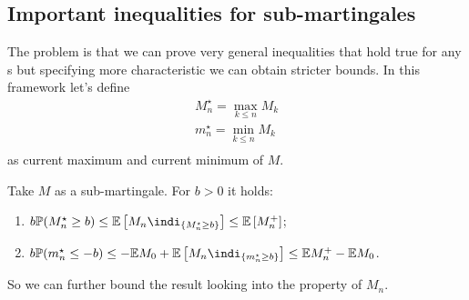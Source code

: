 \documentclass{report}
\begin{document}
\subsection{Important inequalities for sub-martingales}
The problem is that we can prove very general inequalities that hold true for any \rv s but specifying more characteristic we can obtain stricter bounds. In this framework let's define 
\begin{equation*}
	\begin{array}{l}
		M^{\star}_{n}=\max_{k\leq n}M_{k}\\
		m^{\star}_{n}=\min_{k\leq n}M_{k}\\
	\end{array}
\end{equation*}
as current maximum and current minimum of $M$.
\begin{theorem}
	Take $M$ as a sub-martingale. For $b>0$ it holds:
	\begin{enumerate}
		\item $b\pr(M^{\star}_{n}\geq b)\leq\ev\left[M_{n}\indi_{\{M_{n}^{\star}\geq b\}}\right]\leq\ev\left[M_{n}^{+}\right]$;
		\item $b\pr(m^{\star}_{n}\leq-b)\leq-\ev M_{0}+\ev\left[M_{n}\indi_{\{m_{n}^{\star}\geq b\}}\right]\leq\ev M_{n}^{+}-\ev M_{0}$.
	\end{enumerate}
\end{theorem}
So we can further bound the result looking into the property of $M_{n}$.
\end{document}
